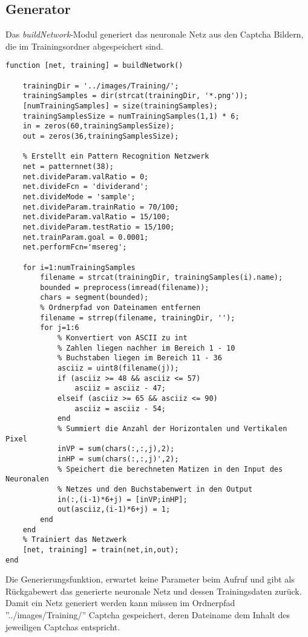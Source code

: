 \subsection{Generator}
Das \textit{buildNetwork}-Modul generiert das neuronale Netz aus den Captcha Bildern, die im Trainingsordner abgespeichert sind.
\begin{lstlisting}
function [net, training] = buildNetwork()

    trainingDir = '../images/Training/';
    trainingSamples = dir(strcat(trainingDir, '*.png'));
    [numTrainingSamples] = size(trainingSamples);
    trainingSamplesSize = numTrainingSamples(1,1) * 6;
    in = zeros(60,trainingSamplesSize);
    out = zeros(36,trainingSamplesSize);
    
    % Erstellt ein Pattern Recognition Netzwerk
    net = patternnet(38);
    net.divideParam.valRatio = 0;
    net.divideFcn = 'dividerand';
    net.divideMode = 'sample';
    net.divideParam.trainRatio = 70/100;
    net.divideParam.valRatio = 15/100;
    net.divideParam.testRatio = 15/100;
    net.trainParam.goal = 0.0001;
    net.performFcn='msereg'; 
  
    for i=1:numTrainingSamples
        filename = strcat(trainingDir, trainingSamples(i).name);  
        bounded = preprocess(imread(filename));     
        chars = segment(bounded);
        % Ordnerpfad von Dateinamen entfernen
        filename = strrep(filename, trainingDir, '');
        for j=1:6
            % Konvertiert von ASCII zu int 
            % Zahlen liegen nachher im Bereich 1 - 10
            % Buchstaben liegen im Bereich 11 - 36
            asciiz = uint8(filename(j));
            if (asciiz >= 48 && asciiz <= 57)
                asciiz = asciiz - 47;
            elseif (asciiz >= 65 && asciiz <= 90)
                asciiz = asciiz - 54;
            end
            % Summiert die Anzahl der Horizontalen und Vertikalen Pixel
            inVP = sum(chars(:,:,j),2);
            inHP = sum(chars(:,:,j)',2);
            % Speichert die berechneten Matizen in den Input des Neuronalen
            % Netzes und den Buchstabenwert in den Output
            in(:,(i-1)*6+j) = [inVP;inHP];
            out(asciiz,(i-1)*6+j) = 1;
        end
    end
    % Trainiert das Netzwerk
    [net, training] = train(net,in,out);       
end
\end{lstlisting}
Die Generierungsfunktion, erwartet keine Parameter beim Aufruf und gibt als Rückgabewert das generierte neuronale Netz und dessen Trainingsdaten zurück.\\
Damit ein Netz generiert werden kann müssen im Ordnerpfad ''../images/Training/'' Captcha gespeichert, deren Dateiname dem Inhalt des jeweiligen Captchas entspricht.\\
